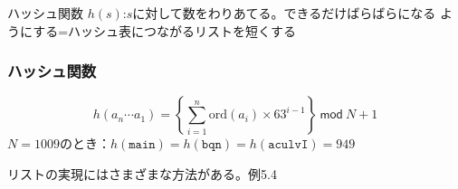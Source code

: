\documentclass[dvipdfmx]{beamer}
\begin{document}
\begin{frame}
\begin{center}
{      %
    }
  \end{center}
  ハッシュ関数 $h(s)$:$s$に対して数をわりあてる。できるだけばらばらになる
  ようにする=ハッシュ表につながるリストを短くする
\end{frame}

\begin{frame}
  \frametitle{ハッシュ関数}

  \[
    h(a_n\cdots a_1)=\left\{\sum^n_{i=1} \mathrm{ord}(a_i)\times 63^{i-1}\right\}\ \mathsf{mod}\ N +1
  \]
  $N=1009$のとき：$h(\mathtt{main})=h(\mathtt{bqn})=h(\mathtt{aculvI})=949$

  リストの実現にはさまざまな方法がある。例5.4

\end{frame}
\end{document}
